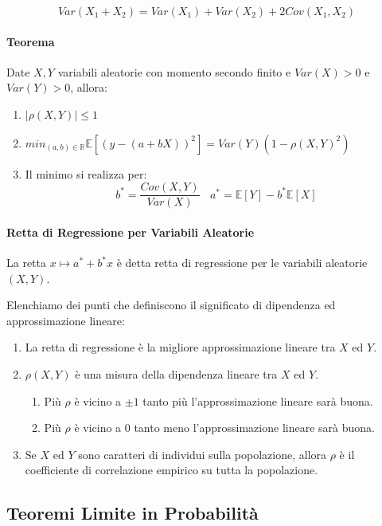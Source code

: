 \documentclass{article}
\begin{document}
\[ Var(X_{1} + X_{2}) = Var(X_{1}) + Var(X_{2}) + 2 Cov(X_{1}, X_{2}) \]

\paragraph{Teorema} Date $X,Y$ variabili aleatorie con momento secondo finito e $Var(X) > 0$ e $Var(Y) > 0$, allora:

\begin{enumerate}
    \item $|\rho(X,Y)| \leq 1 $
    \item $min_{(a,b) \in \mathbb{R}} \mathbb{E}[(y - (a+bX))^{2}] = Var(Y) (1 - \rho(X,Y)^{2})$
    \item Il minimo si realizza per:
    \[ b^{*} = \frac{Cov(X,Y)}{Var(X)} \:\:\:\: a^{*} = \mathbb{E}[Y] - b^{*}\mathbb{E}[X] \]
\end{enumerate}

\newpage

\paragraph{Retta di Regressione per Variabili Aleatorie} La retta $ x \mapsto a^{*} + b^{*}x $ è detta retta di regressione per le variabili aleatorie $(X,Y)$.

Elenchiamo dei punti che definiscono il significato di dipendenza ed approssimazione lineare:

\begin{enumerate}
    \item La retta di regressione è la migliore approssimazione lineare tra $X$ ed $Y$.
    \item $\rho(X,Y)$ è una misura della dipendenza lineare tra $X$ ed $Y$.
    \begin{enumerate}
        \item Più $\rho$ è vicino a $\pm 1$ tanto più l'approssimazione lineare sarà buona.
        \item Più $\rho$ è vicino a $0$ tanto meno l'approssimazione lineare sarà buona.
    \end{enumerate}
    \item Se $X$ ed $Y$ sono caratteri di individui sulla popolazione, allora $\rho$ è il coefficiente di correlazione empirico su tutta la popolazione.
\end{enumerate}

\subsection{Teoremi Limite in Probabilità}
\end{document}
